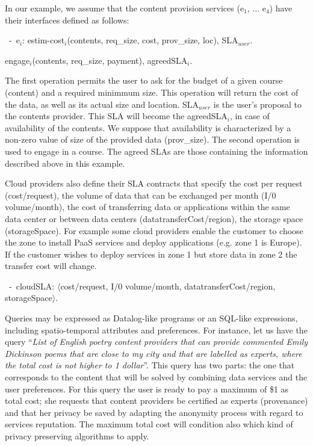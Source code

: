 In our example, we assume that the content provision services ({\sf e$_1$, ... e$_4$}) have their interfaces defined as follows:
\begin{trivlist}\sf\footnotesize
\item[~-~e$_i$:]estim-cost$_i$(contents, req\_size, cost, prov\_size, loc), SLA$_\mathit{user}$.

                engage$_i$(contents, req\_size, payment), agreedSLA$_i$.
\end{trivlist}

The first operation permits the user to ask for the budget of a given course (content) and a required minimmum size.
This operation will return the cost of the data, as well as its actual size and location.
{\sf SLA}$_\mathit{user}$ is the user's proposal to the contents provider. 
This SLA will become the {\sf agreedSLA}$_i$, in case of availability of the contents. 
We suppose that availability is characterized by a non-zero value of size of the provided data ({\sf prov\_size}).
The second operation is used to engage in a course. 
The agreed SLAs are those containing the information described above in this example.



Cloud providers also define their SLA contracts that specify the cost per request ({\sf cost/request}), the volume of data that can be exchanged per month ({\sf I/0 volume/month}), the cost of transferring data or applications within the same data center or between data centers ({\sf datatransferCost/region}), the storage space ({\sf storageSpace}). For example some cloud providers enable the customer to choose the zone to install PaaS services and deploy applications (e.g. zone 1 is Europe). If the customer wishes to deploy services in zone 1 but store data in zone 2 the transfer cost will change.

\begin{trivlist}\sf\footnotesize
 \item[~-~cloudSLA:]  $\langle$cost/request, I/0 volume/month, datatransferCost/region, storageSpace$\rangle$.
 \end{trivlist}
 

Queries may be expressed as Datalog-like programs or an SQL-like expressions, including spatio-temporal attributes and preferences.
For instance, let us have the query ``\textit{List of English poetry content providers that can provide commented Emily Dickinson poems that are close to my city and that are labelled as experts, where the total cost is not higher to 1 dollar}''. 
This query has two parts: the one that corresponds to the content that will be solved by combining data services and the user preferences. For this query the user is ready to pay a maximum of \$1 as total cost; she requests that content providers be certified as experts (provenance) and that her privacy be saved by adapting the anonymity process with regard to services reputation. The maximum total cost will condition also which kind of privacy preserving algorithms to apply.

